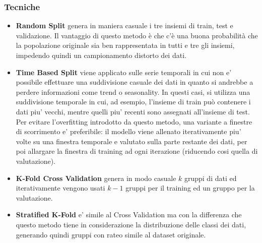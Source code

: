 \subsubsection{Tecniche}
\begin{itemize}
	\item \textbf{Random Split} genera in maniera casuale i tre insiemi di train, test e validazione. Il vantaggio di questo metodo è che c'è una buona probabilità che la popolazione originale sia ben rappresentata in tutti e tre gli insiemi, impedendo quindi un campionamento distorto dei dati.
	\item \textbf{Time Based Split} viene applicato sulle serie temporali in cui non e' possibile effettuare una suddivisione casuale dei dati in quanto si andrebbe a perdere informazioni come trend o seasonality. 
	      In questi casi, si utilizza una suddivisione temporale in cui, ad esempio, l'insieme di train può contenere i dati piu' vecchi, mentre quelli piu' recenti sono assegnati all'insieme di test. Per evitare l'overfitting introdotto da questo metodo, una variante a finestre di scorrimento e' preferibile: il modello viene allenato iterativamente piu' volte su una finestra temporale e valutato sulla parte restante dei dati, per poi allargare la finestra di training ad ogni iterazione (riducendo cosi quella di valutazione).
	\item \textbf{K-Fold Cross Validation} genera in modo casuale $k$ gruppi di dati ed iterativamente vengono usati $k-1$ gruppi per il training ed un gruppo per la valutazione.
	\item \textbf{Stratified K-Fold} e' simile al Cross Validation ma con la differenza che questo metodo tiene in considerazione la distribuzione delle classi dei dati, generando quindi gruppi con rateo simile al dataset originale.
\end{itemize}


